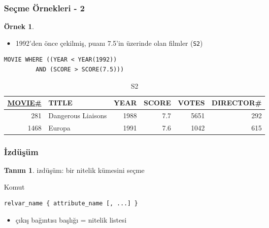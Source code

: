\documentclass[dvipsnames]{beamer}
\theoremstyle{definition}
\newtheorem{tanim}[theorem]{Tanım}
\theoremstyle{example}
\newtheorem{ornek}[theorem]{Örnek}
\theoremstyle{plain}
\begin{document}
\begin{frame}[fragile]
  \frametitle{Seçme Örnekleri - 2}

  \begin{ornek}
    \begin{itemize}
      \item 1992'den önce çekilmiş, puanı 7.5'in üzerinde olan filmler
        (\texttt{S2})
    \end{itemize}

    \begin{lstlisting}
MOVIE WHERE ((YEAR < YEAR(1992))
         AND (SCORE > SCORE(7.5)))
    \end{lstlisting}

    \pause
    \vspace{-10pt}
    \begin{tiny}
    \begin{table}
      \caption{S2}
      \begin{tabular}{|r|l|r|r|r|r|}\hline
\underline{MOVIE\#} & TITLE & YEAR & SCORE & VOTES & DIRECTOR\#\\[2pt]\hline\hline
   281 & Dangerous Liaisons & 1988 &   7.7 &  5651 &        292\\\hline
  1468 & Europa             & 1991 &   7.6 &  1042 &        615\\\hline
      \end{tabular}
    \end{table}
    \end{tiny}
  \end{ornek}
\end{frame}

\begin{frame}[fragile]
  \frametitle{İzdüşüm}

  \begin{tanim}
    \alert{izdüşüm}: bir nitelik kümesini seçme
  \end{tanim}

  \pause
  \begin{block}{Komut}
    \begin{lstlisting}
relvar_name { attribute_name [, ...] }
    \end{lstlisting}
  \end{block}

  \pause
  \begin{itemize}
    \item çıkış bağıntısı başlığı = nitelik listesi
  \end{itemize}
\end{frame}
\end{document}
